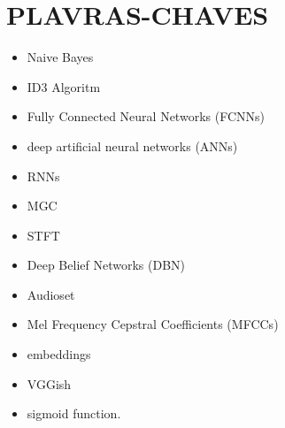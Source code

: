 \documentclass{article}
\begin{document}
\section{PLAVRAS-CHAVES}
\begin{itemize}
    	\item Naive Bayes
    	\item ID3 Algoritm
    	\item Fully Connected Neural Networks (FCNNs)
    	\item deep artificial neural networks (ANNs)
	\item RNNs
	\item MGC
	\item STFT
	\item Deep Belief Networks (DBN)
	\item Audioset
	\item Mel Frequency Cepstral Coefficients (MFCCs)
	\item embeddings
	\item VGGish
	\item sigmoid function.
\end{itemize}
\end{document}
